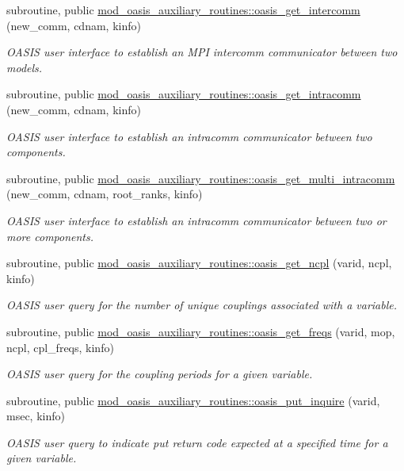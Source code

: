 \begin{DoxyCompactItemize}
subroutine, public \hyperlink{namespacemod__oasis__auxiliary__routines_a589021c0f1427f8e5edb1c7efcd7fa2c}{mod\+\_\+oasis\+\_\+auxiliary\+\_\+routines\+::oasis\+\_\+get\+\_\+intercomm} (new\+\_\+comm, cdnam, kinfo)
\begin{DoxyCompactList}\small\item\em O\+A\+S\+IS user interface to establish an M\+PI intercomm communicator between two models. \end{DoxyCompactList}\item 
subroutine, public \hyperlink{namespacemod__oasis__auxiliary__routines_aa1959db40e8c27dea289b97458929526}{mod\+\_\+oasis\+\_\+auxiliary\+\_\+routines\+::oasis\+\_\+get\+\_\+intracomm} (new\+\_\+comm, cdnam, kinfo)
\begin{DoxyCompactList}\small\item\em O\+A\+S\+IS user interface to establish an intracomm communicator between two components. \end{DoxyCompactList}\item 
subroutine, public \hyperlink{namespacemod__oasis__auxiliary__routines_aaab3f229e1733a7d48ac0cc44d344c7f}{mod\+\_\+oasis\+\_\+auxiliary\+\_\+routines\+::oasis\+\_\+get\+\_\+multi\+\_\+intracomm} (new\+\_\+comm, cdnam, root\+\_\+ranks, kinfo)
\begin{DoxyCompactList}\small\item\em O\+A\+S\+IS user interface to establish an intracomm communicator between two or more components. \end{DoxyCompactList}\item 
subroutine, public \hyperlink{namespacemod__oasis__auxiliary__routines_a154d3345ef9691e378afdc871086f7eb}{mod\+\_\+oasis\+\_\+auxiliary\+\_\+routines\+::oasis\+\_\+get\+\_\+ncpl} (varid, ncpl, kinfo)
\begin{DoxyCompactList}\small\item\em O\+A\+S\+IS user query for the number of unique couplings associated with a variable. \end{DoxyCompactList}\item 
subroutine, public \hyperlink{namespacemod__oasis__auxiliary__routines_a62d1c98c05bcc4bd5e8796866bcce2db}{mod\+\_\+oasis\+\_\+auxiliary\+\_\+routines\+::oasis\+\_\+get\+\_\+freqs} (varid, mop, ncpl, cpl\+\_\+freqs, kinfo)
\begin{DoxyCompactList}\small\item\em O\+A\+S\+IS user query for the coupling periods for a given variable. \end{DoxyCompactList}\item 
subroutine, public \hyperlink{namespacemod__oasis__auxiliary__routines_a7a95eb579171b6c2f06ff532c7823e2e}{mod\+\_\+oasis\+\_\+auxiliary\+\_\+routines\+::oasis\+\_\+put\+\_\+inquire} (varid, msec, kinfo)
\begin{DoxyCompactList}\small\item\em O\+A\+S\+IS user query to indicate put return code expected at a specified time for a given variable. \end{DoxyCompactList}\end{DoxyCompactItemize}
